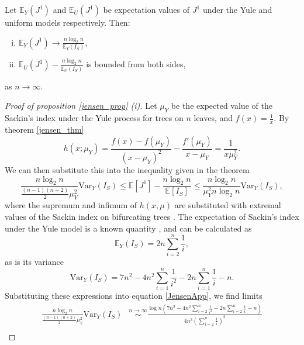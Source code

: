 \begin{proposition}\label{jensen_prop}
    Let $\mathbb{E}_Y(J^1)$ and $\mathbb{E}_U(J^1)$ be expectation values of $J^1$ under the Yule and uniform models respectively. Then:
    \begin{enumerate}[(i)]
        \item $\mathbb{E}_Y(J^1)\to\frac{n\log_2n}{\mathbb{E}_Y(I_S)}$,
        \item $\mathbb{E}_U(J^1)-\frac{n\log_2n}{\mathbb{E}_U(I_S)}$ is bounded from both sides,
    \end{enumerate}
    as $n\to\infty$.
\end{proposition}
\begin{proof}[Proof of proposition \ref{jensen_prop} (i)]
Let $\mu_Y$ be the expected value of the Sackin's index under the Yule process for trees on $n$ leaves, and $f(x)=\frac{1}{x}$. By theorem \ref{jensen_thm}
\begin{equation}\label{hxmuY}
    h(x;\mu_Y) = \frac{f(x)-f(\mu_Y)}{(x-\mu_Y)^2} - \frac{f'(\mu_Y)}{x-\mu_Y} = \frac{1}{x\mu_Y^2}.
\end{equation}
 We can then substitute this into the inequality given in the theorem
\begin{equation}\label{JensenApp}
    \frac{n\log_2n}{\frac{(n-1)(n+2)}{2}\mu_Y^2} \text{Var}_Y(I_S) \leq \mathbb{E}[J^1] - \frac{n\log_2n}{\mathbb{E}[I_S]} \leq \frac{n\log_2n}{\mu_Y^2n\log_2n}\text{Var}_Y(I_S),
\end{equation}
where the supremum and infimum of $h(x,\mu)$ are substituted with extremal values of the Sackin index on bifurcating trees \cite{fischer_extremal_2021}. The expectation of Sackin's index under the Yule model is a known quantity \cite{cardona_exact_2012}, and can be calculated as
\begin{equation}\label{yule_exp_sackin}
    \mathbb{E}_Y(I_S) = 2n\sum_{i=2}^n\frac{1}{i},
\end{equation}
as is its variance
\begin{equation}\label{varIS}
    \text{Var}_Y(I_S) = 7n^2 - 4n^2\sum_{i=1}^n\frac{1}{i^2} - 2n\sum_{i=1}^{n}\frac{1}{i} - n.
\end{equation}
Substituting these expressions into equation \eqref{JensenApp}, we find limits
\begin{align*}
    \frac{n\log_2n}{\frac{(n-1)(n+2)}{2}\mu_Y^2} \text{Var}_Y(I_S) &\stackrel{n\to\infty}{\sim} \frac{\log n\left(7n^2 - 4n^2\sum_{i=2}^n\frac{1}{i^2}-2n\sum_{i=2}^n\frac{1}{i}-n\right)}{4n^3\left(\sum_{i=2}^n\frac{1}{i}\right)^2} \\

\end{align*}
\end{proof}

